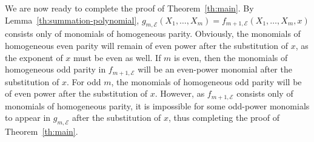 We are now ready to complete the proof of Theorem~\ref{th:main}.
%
By Lemma~\ref{th:summation-polynomial},
$g_{m,\mathcal E}(X_1,\ldots,X_m)=f_{m+1,\mathcal
  E}(X_1,\ldots,X_m,x)$ consists only of monomials of homogeneous
parity.
%
Obviously, the monomials of homogeneous even parity will remain of
even power after the substitution of $x$, as the exponent of $x$ must
be even as well.
%
If $m$ is even, then the monomials of homogeneous odd parity in
$f_{m+1,\mathcal E}$ will be an even-power monomial after the
substitution of $x$.
%
For odd $m$, the monomials of homogeneous odd parity will be of even
power after the substitution of $x$.
%
However, as $f_{m+1,\mathcal E}$ consists only of monomials of
homogeneous parity, it is impossible for some odd-power monomials to
appear in $g_{m,\mathcal E}$ after the substitution of $x$, thus
completing the proof of Theorem~\ref{th:main}.
